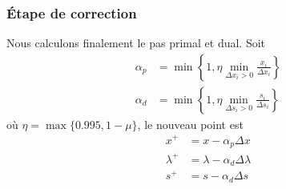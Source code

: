 \documentclass[usepdftitle=false, aspectratio=169]{beamer}
\begin{document}
\begin{frame}
\frametitle{Étape de correction}

Nous calculons finalement le pas primal et dual. Soit
\begin{align*}
\alpha_p &= \min \left\{1, \eta \min_{\Delta x_i>0} \frac{x_i}{\Delta x_i} \right\} \\
\alpha_d &= \min \left\{1, \eta \min_{\Delta s_i>0} \frac{s_i}{\Delta s_i} \right\}
\end{align*}
où $\eta = \max\{0.995, 1 - \mu\}$, le nouveau point est
\begin{align*}
x^+ &= x - \alpha_p \Delta x \\
\lambda^+ &= \lambda - \alpha_d \Delta \lambda \\
s^+ &= s - \alpha_d \Delta s
\end{align*}

\end{frame}
\end{document}
